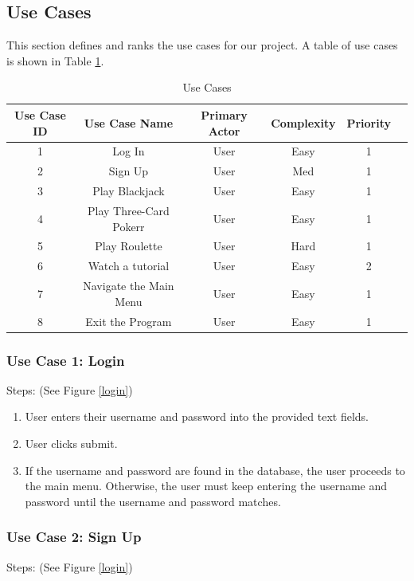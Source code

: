 \documentclass[10pt,conference,onecolumn,compsoc]{IEEEtran}
\begin{document}
\subsection{Use Cases}
This section defines and ranks the use cases for our project. A table of use cases is shown in Table \ref{tab:useCaseIndex}.

\begin{table}
\centering
\begin{tabular}{|c|c|c|c|c|c|}
\hline
Use Case ID & Use Case Name & Primary Actor & Complexity & Priority \\
\hline \hline
1 & Log In & User & Easy & 1\\
\hline
2 & Sign Up & User & Med & 1\\
\hline
3 & Play Blackjack & User & Easy & 1\\
\hline
4 & Play Three-Card Pokerr & User & Easy & 1\\
\hline
5 & Play Roulette & User & Hard & 1\\
\hline
6 & Watch a tutorial & User & Easy & 2\\
\hline
7 & Navigate the Main Menu & User & Easy & 1\\
\hline
8 & Exit the Program & User & Easy & 1\\
\hline
\end{tabular}
\caption{Use Cases}
\label{tab:useCaseIndex}
\end{table}

\subsubsection{Use Case 1: Login}
Steps: (See Figure \ref{login})
\begin{enumerate}
\item User enters their username and password into the provided text fields.
\item User clicks submit.
\item If the username and password are found in the database, the user proceeds to the main menu. Otherwise, the user must keep entering the username and password until the username and password matches.
\end{enumerate}

\subsubsection{Use Case 2: Sign Up}
Steps: (See Figure \ref{login})
\end{document}
